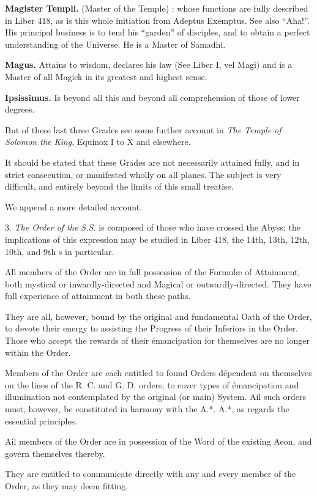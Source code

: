 \textbf{Magister Templi.} \textemdash{} (Master of the Temple) : whose functions are fully described in Liber 418, as is this whole initiation from Adeptus Exemptus. See also \enquote{Aha!}. His principal business is to tend his \enquote{garden} of disciples, and to obtain a perfect understanding of the Universe. He is a Master of Samadhi.

\textbf{Magus.} \textemdash{} Attains to wisdom, declares his law (See Liber I, vel Magi) and is a Master of all Magick in its greatest and
highest sense.

\textbf{Ipsissimus.} \textemdash{} Is beyond all this and beyond all comprehension of those of lower degrees.

But of these last three Grades see some further account in \textit{The Temple of Solomon the King}, Equinox I to X and elsewhere.

It should be stated that these Grades are not necessarily attained fully, and in strict consecution, or manifested wholly on all planes. The subject is very difficult, and entirely beyond the limits of this small treatise.

We append a more detailed account.

3. \textit{The Order of the S.S.} is composed of those who have crossed the Abyss; the implications of this expression may be studied in Liber 418, the 14th, 13th, 12th, 10th, and 9th \AEthyr{}s in particular.

All members of the Order are in full possession of the Formul\ae{} of Attainment, both mystical or inwardly-directed and Magical or outwardly-directed. They have full experience of attainment in both these paths.

They are all, however, bound by the original and fundamental Oath of the Order, to devote their energy to assisting the Progress of their Inferiors in the Order. Those who accept the rewards of their émancipation for themselves are no longer within the Order.

Members of the Order are each entitled to found Orders dépendent on themselves on the lines of the R. C. and G. D. orders, to cover types of émancipation and illumination not contemplated by the original (or main) System. Ail such orders must, however, be constituted in harmony with the A.*. A.*, as regards the essential principles.

Ail members of the Order are in possession of the Word of the existing Aeon, and govern themselves thereby.

They are entitled to communicate directly with any and every member of the Order, as they may deem fitting.

